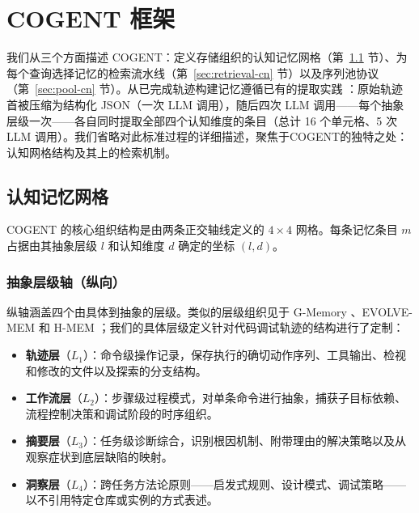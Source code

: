 \documentclass[UTF8,twocolumn]{ctexart}
\begin{document}
\section{COGENT 框架}

我们从三个方面描述 \textsc{COGENT}：定义存储组织的认知记忆网格（第~\ref{sec:lattice-cn} 节）、为每个查询选择记忆的检索流水线（第~\ref{sec:retrieval-cn} 节）以及序列池协议（第~\ref{sec:pool-cn} 节）。从已完成轨迹构建记忆遵循已有的提取实践 \cite{expel, reflexion}：原始轨迹首被压缩为结构化 JSON（一次 LLM 调用），随后四次 LLM 调用——每个抽象层级一次——各自同时提取全部四个认知维度的条目（总计 16 个单元格、5 次 LLM 调用）。我们省略对此标准过程的详细描述，聚焦于\textsc{COGENT}的独特之处：认知网格结构及其上的检索机制。

\subsection{认知记忆网格}
\label{sec:lattice-cn}

\textsc{COGENT} 的核心组织结构是由两条正交轴线定义的 $4 \times 4$ 网格。每条记忆条目 $m$ 占据由其抽象层级 $l$ 和认知维度 $d$ 确定的坐标 $(l, d)$。

\subsubsection{抽象层级轴（纵向）}

纵轴涵盖四个由具体到抽象的层级。类似的层级组织见于 G-Memory \cite{g-memory}、EVOLVE-MEM \cite{evolve-mem} 和 H-MEM \cite{h-mem}；我们的具体层级定义针对代码调试轨迹的结构进行了定制：

\begin{itemize}
    \item \textbf{轨迹层}（$L_1$）：命令级操作记录，保存执行的确切动作序列、工具输出、检视和修改的文件以及探索的分支结构。
    \item \textbf{工作流层}（$L_2$）：步骤级过程模式，对单条命令进行抽象，捕获子目标依赖、流程控制决策和调试阶段的时序组织。
    \item \textbf{摘要层}（$L_3$）：任务级诊断综合，识别根因机制、附带理由的解决策略以及从观察症状到底层缺陷的映射。
    \item \textbf{洞察层}（$L_4$）：跨任务方法论原则——启发式规则、设计模式、调试策略——以不引用特定仓库或实例的方式表述。
\end{itemize}
\end{document}
